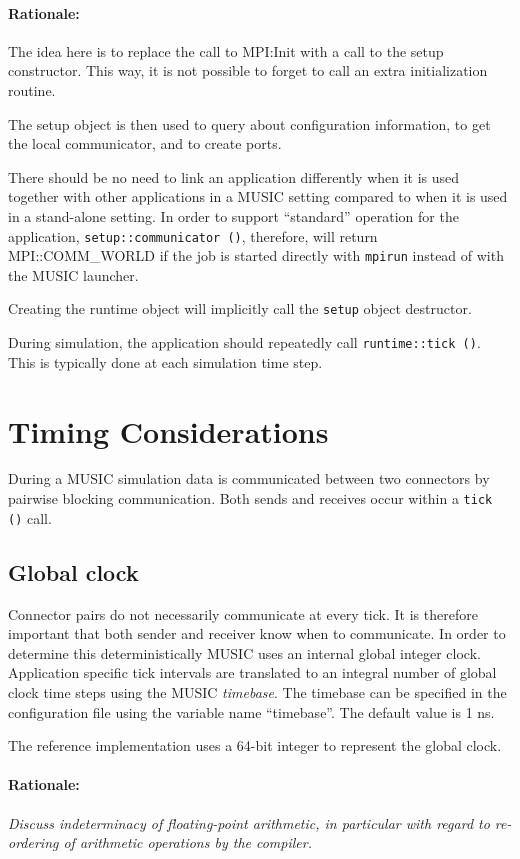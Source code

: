 \documentclass[a4paper]{report}
\newenvironment{rationale}%
{\par\paragraph{Rationale:}}%
{\par}
\begin{document}
\begin{metatext}
\begin{rationale}
  The idea here is to replace the call to MPI:Init with a call to the
  setup constructor.  This way, it is not possible to forget to call
  an extra initialization routine.
\end{rationale}

The setup object is then used to query about configuration
information, to get the local communicator, and to create ports.

There should be no need to link an application differently when it is
used together with other applications in a MUSIC setting compared to
when it is used in a stand-alone setting.  In order to support
``standard'' operation for the application,
\lstinline|setup::communicator ()|, therefore, will return
MPI::COMM\_WORLD if the job is started directly with
\lstinline|mpirun| instead of with the MUSIC launcher.

Creating the runtime object will implicitly call the \lstinline|setup|
object destructor.

During simulation, the application should repeatedly call
\lstinline|runtime::tick ()|.  This is typically done at each simulation
time step.

\section{Timing Considerations}

During a MUSIC simulation data is communicated between two connectors
by pairwise blocking communication.  Both sends and receives occur
within a \lstinline|tick ()| call.

\subsection{Global clock}

Connector pairs do not necessarily communicate at every tick.  It is
therefore important that both sender and receiver know when to
communicate.  In order to determine this deterministically MUSIC uses
an internal global integer clock.  Application specific tick intervals
are translated to an integral number of global clock time steps using
the MUSIC \emph{timebase}.  The timebase can be specified in the
configuration file using the variable name ``timebase''.  The default
value is 1 ns.

The reference implementation uses a 64-bit integer to represent the
global clock.

\begin{rationale}
  \emph{Discuss indeterminacy of floating-point arithmetic, in particular
    with regard to re-ordering of arithmetic operations by the compiler.}
\end{rationale}


\end{metatext}
\end{document}
